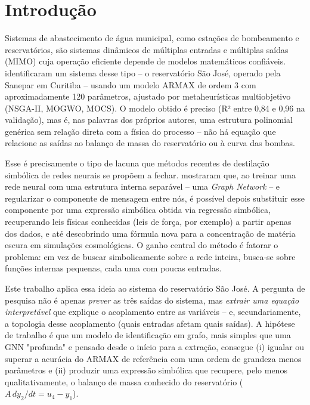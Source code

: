 \documentclass[
	article,		%
	12pt,			%
	oneside,
	a4paper,
	brazil
]{abntex2}
\begin{document}
\vspace{12pt}

\section{Introdução}

Sistemas de abastecimento de água municipal, como estações de bombeamento
e reservatórios, são sistemas dinâmicos de múltiplas entradas e múltiplas
saídas (MIMO) cuja operação eficiente depende de modelos matemáticos
confiáveis.  identificaram um sistema desse tipo --
o reservatório São José, operado pela Sanepar em Curitiba -- usando um
modelo ARMAX de ordem 3 com aproximadamente 120 parâmetros, ajustado por
metaheurísticas multiobjetivo (NSGA-II, MOGWO, MOCS). O modelo obtido é
preciso (R² entre 0,84 e 0,96 na validação), mas é, nas palavras dos
próprios autores, uma estrutura polinomial genérica sem relação direta com
a física do processo -- não há equação que relacione as saídas ao balanço
de massa do reservatório ou à curva das bombas.

Esse é precisamente o tipo de lacuna que métodos recentes de destilação
simbólica de redes neurais se propõem a fechar.
 mostraram que, ao treinar uma rede neural com uma
estrutura interna separável -- uma \textit{Graph Network}
\cite{battaglia2018} -- e regularizar o componente de mensagem entre nós,
é possível depois substituir esse componente por uma expressão simbólica
obtida via regressão simbólica, recuperando leis físicas conhecidas (leis
de força, por exemplo) a partir apenas dos dados, e até descobrindo uma
fórmula nova para a concentração de matéria escura em simulações
cosmológicas. O ganho central do método é fatorar o problema: em vez de
buscar simbolicamente sobre a rede inteira, busca-se sobre funções internas
pequenas, cada uma com poucas entradas.

Este trabalho aplica essa ideia ao sistema do reservatório São José. A
pergunta de pesquisa não é apenas \emph{prever} as três saídas do sistema,
mas \emph{extrair uma equação interpretável} que explique o acoplamento
entre as variáveis -- e, secundariamente, a topologia desse acoplamento
(quais entradas afetam quais saídas). A hipótese de trabalho é que um
modelo de identificação em grafo, mais simples que uma GNN "profunda" e
pensado desde o início para a extração, consegue (i) igualar ou superar a
acurácia do ARMAX de referência com uma ordem de grandeza menos parâmetros
e (ii) produzir uma expressão simbólica que recupere, pelo menos
qualitativamente, o balanço de massa conhecido do reservatório
($A\, dy_2/dt = u_4 - y_1$).
\end{document}
